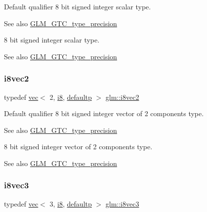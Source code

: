 Default qualifier 8 bit signed integer scalar type. \begin{DoxySeeAlso}{See also}
\mbox{\hyperlink{group__gtc__type__precision}{G\+L\+M\+\_\+\+G\+T\+C\+\_\+type\+\_\+precision}}
\end{DoxySeeAlso}
8 bit signed integer scalar type. \begin{DoxySeeAlso}{See also}
\mbox{\hyperlink{group__gtc__type__precision}{G\+L\+M\+\_\+\+G\+T\+C\+\_\+type\+\_\+precision}} 
\end{DoxySeeAlso}
\mbox{\label{group__gtc__type__precision_gade57e4b55fe2b2345a4f2ac2b149cd32}} 
\subsubsection{\texorpdfstring{i8vec2}{i8vec2}}
{\footnotesize\ttfamily typedef \mbox{\hyperlink{structglm_1_1vec}{vec}}$<$ 2, \mbox{\hyperlink{group__gtc__type__precision_gaae064be68b7d36cd7910c16e8ad18bba}{i8}}, \mbox{\hyperlink{namespaceglm_a36ed105b07c7746804d7fdc7cc90ff25a9d21ccd8b5a009ec7eb7677befc3bf51}{defaultp}} $>$ \mbox{\hyperlink{group__gtc__type__precision_gade57e4b55fe2b2345a4f2ac2b149cd32}{glm\+::i8vec2}}}

Default qualifier 8 bit signed integer vector of 2 components type. \begin{DoxySeeAlso}{See also}
\mbox{\hyperlink{group__gtc__type__precision}{G\+L\+M\+\_\+\+G\+T\+C\+\_\+type\+\_\+precision}}
\end{DoxySeeAlso}
8 bit signed integer vector of 2 components type. \begin{DoxySeeAlso}{See also}
\mbox{\hyperlink{group__gtc__type__precision}{G\+L\+M\+\_\+\+G\+T\+C\+\_\+type\+\_\+precision}} 
\end{DoxySeeAlso}
\mbox{\label{group__gtc__type__precision_ga9babb834daa1f84c23821bd21669c2e8}} 
\subsubsection{\texorpdfstring{i8vec3}{i8vec3}}
{\footnotesize\ttfamily typedef \mbox{\hyperlink{structglm_1_1vec}{vec}}$<$ 3, \mbox{\hyperlink{group__gtc__type__precision_gaae064be68b7d36cd7910c16e8ad18bba}{i8}}, \mbox{\hyperlink{namespaceglm_a36ed105b07c7746804d7fdc7cc90ff25a9d21ccd8b5a009ec7eb7677befc3bf51}{defaultp}} $>$ \mbox{\hyperlink{group__gtc__type__precision_ga9babb834daa1f84c23821bd21669c2e8}{glm\+::i8vec3}}}

